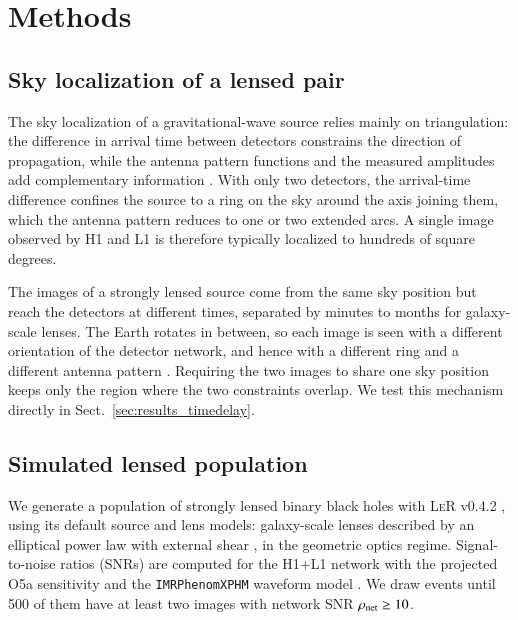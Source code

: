 \documentclass{aa}
\begin{document}
\newpage 
\fi

\section{Methods}
\label{sec:methods}

\subsection{Sky localization of a lensed pair}
\label{sec:antenna_pattern}

The sky localization of a gravitational-wave source relies mainly on
triangulation: the difference in arrival time between detectors constrains
the direction of propagation, while the antenna pattern functions and the
measured amplitudes add complementary information \citep{triangulation_GW}.
With only two detectors, the arrival-time difference confines the source to
a ring on the sky around the axis joining them, which the antenna pattern
reduces to one or two extended arcs. A single image observed by H1 and L1
is therefore typically localized to hundreds of square degrees.

The images of a strongly lensed source come from the same sky position but
reach the detectors at different times, separated by minutes to months for
galaxy-scale lenses. The Earth rotates in between, so each image is seen
with a different orientation of the detector network, and hence with a
different ring and a different antenna pattern
\citep{Hannuksela_skyloc,hubble_constant_lensing}. Requiring the two images to share one sky position keeps only the region where the two constraints
overlap. We test this mechanism directly in
Sect.~\ref{sec:results_timedelay}.

\subsection{Simulated lensed population}
\label{sec:population}

We generate a population of strongly lensed binary black holes with
\textsc{LeR} v0.4.2
\citep{phurailatpam2026lerlvkligovirgokagracollaboration}, using its default
source and lens models: galaxy-scale lenses described by an elliptical
power law with external shear \citep{Tessore2015}, in the geometric optics
regime. Signal-to-noise ratios (SNRs) are computed for the H1+L1 network
with the projected O5a sensitivity \citep{O5PSD} and the
\texttt{IMRPhenomXPHM} waveform model \citep{IMRPhenomXPHM}. We draw events
until 500 of them have at least two images with network SNR
$\rho_{\rm net} \geq 10$.
\end{document}
